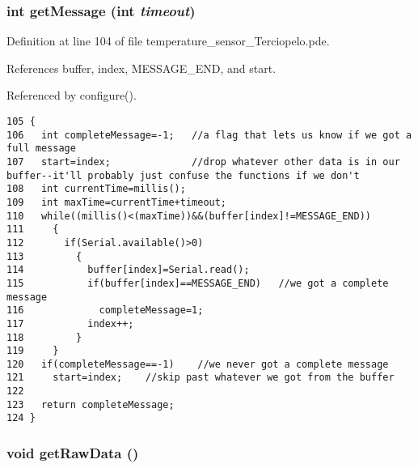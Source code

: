 \hypertarget{temperature__sensor___terciopelo_8pde_8f2521044963073c55b3c290fffd79e3}{
\subsubsection[{getMessage}]{\setlength{\rightskip}{0pt plus 5cm}int getMessage (int {\em timeout})}}
\label{temperature__sensor___terciopelo_8pde_8f2521044963073c55b3c290fffd79e3}




Definition at line 104 of file temperature\_\-sensor\_\-Terciopelo.pde.

References buffer, index, MESSAGE\_\-END, and start.

Referenced by configure().

\begin{Code}\begin{verbatim}105 {
106   int completeMessage=-1;   //a flag that lets us know if we got a full message
107   start=index;              //drop whatever other data is in our buffer--it'll probably just confuse the functions if we don't
108   int currentTime=millis();
109   int maxTime=currentTime+timeout;  
110   while((millis()<(maxTime))&&(buffer[index]!=MESSAGE_END))
111     {
112       if(Serial.available()>0)
113         {
114           buffer[index]=Serial.read();
115           if(buffer[index]==MESSAGE_END)   //we got a complete message
116             completeMessage=1;
117           index++;
118         }
119     }
120   if(completeMessage==-1)    //we never got a complete message
121     start=index;    //skip past whatever we got from the buffer
122   
123   return completeMessage;
124 }
\end{verbatim}
\end{Code}


\hypertarget{temperature__sensor___terciopelo_8pde_cfc975251dbc3a8c9a9b11f8df62cc41}{
\subsubsection[{getRawData}]{\setlength{\rightskip}{0pt plus 5cm}void getRawData ()}}
\label{temperature__sensor___terciopelo_8pde_cfc975251dbc3a8c9a9b11f8df62cc41}



